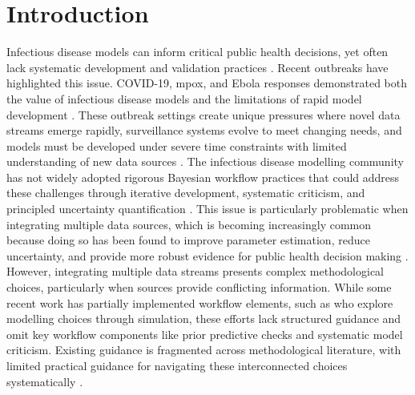 \documentclass{article}
\begin{document}
\tableofcontents
\newpage

\section{Introduction}

Infectious disease models can inform critical public health decisions, yet often lack systematic development and validation practices \citep{Ward2024-sp, Fyles2024-qz, Abbott2021-delta, Abbott2022-prevalence}.
Recent outbreaks have highlighted this issue.
COVID-19, mpox, and Ebola responses demonstrated both the value of infectious disease models and the limitations of rapid model development \citep{knock2021key, ro2025estimating, Abbott2021-delta, Abbott2022-prevalence, Ward2024-sp,birrell2025real}.
These outbreak settings create unique pressures where novel data streams emerge rapidly, surveillance systems evolve to meet changing needs, and models must be developed under severe time constraints with limited understanding of new data sources \citep{mccaw2023role}.
The infectious disease modelling community has not widely adopted rigorous Bayesian workflow practices that could address these challenges through iterative development, systematic criticism, and principled uncertainty quantification \citep{gelman2020bayesian, nicholson2022interoperability}.
This issue is particularly problematic when integrating multiple data sources, which is becoming increasingly common because doing so has been found to improve parameter estimation, reduce uncertainty, and provide more robust evidence for public health decision making \citep{deangelis2018analysing, sherratt2021exploring}.
However, integrating multiple data streams presents complex methodological choices, particularly when sources provide conflicting information.
While some recent work has partially implemented workflow elements, such as \citet{bouman2024bayesian} who explore modelling choices through simulation, these efforts lack structured guidance and omit key workflow components like prior predictive checks and systematic model criticism.
Existing guidance is fragmented across methodological literature, with limited practical guidance for navigating these interconnected choices systematically \citep{nicholson2022interoperability, deangelis2018analysing}.
\end{document}
